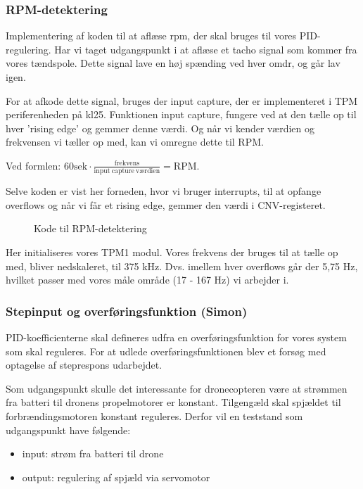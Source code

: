 \subsubsection{RPM-detektering}
\label{sec:rpm-detektering}

Implementering af koden til at aflæse rpm, der skal bruges til vores PID-regulering. Har vi taget udgangspunkt i at aflæse et tacho signal som kommer fra vores tændspole. Dette signal lave en høj spænding ved hver omdr, og går lav igen. 

For at afkode dette signal, bruges der input capture, der er implementeret i TPM periferenheden på kl25. Funktionen input capture, fungere ved at den tælle op til hver ’rising edge’ og gemmer denne værdi. Og når vi kender værdien og frekvensen vi tæller op med, kan vi omregne dette til RPM. 

Ved formlen: $60 \mathrm{sek} \cdot \frac{\mathrm{frekvens}}{\mathrm{input\ capture\ værdien}}=\mathrm{RPM}$.

Selve koden er vist her forneden, hvor vi bruger interrupts, til at opfange overflows og når vi får et rising edge, gemmer den værdi i CNV-registeret.

\begin{figure}[h]
  \centering
    
  \caption{Kode til RPM-detektering}
  \label{fig:kodes3}
\end{figure}

Her initialiseres vores TPM1 modul. Vores frekvens der bruges til at tælle op med, bliver nedskaleret, til 375 kHz. Dvs. imellem hver overflows går der 5,75 Hz, hvilket passer med vores måle område (17 - 167 Hz) vi arbejder i.

\subsubsection{Stepinput og overføringsfunktion (Simon)}
\label{sec:tests}

PID-koefficienterne skal defineres udfra en overføringsfunktion for vores system som skal reguleres. For at udlede overføringsfunktionen blev et forsøg med optagelse af steprespons udarbejdet.


Som udgangspunkt skulle det interessante for dronecopteren være at %
strømmen fra batteri til dronens propelmotorer er konstant. Tilgengæld skal spjældet til forbrændingsmotoren konstant reguleres. Derfor vil en teststand som udgangspunkt have følgende:
\begin{itemize}
\item input: strøm fra batteri til drone
\item output: regulering af spjæld via servomotor
\end{itemize}

